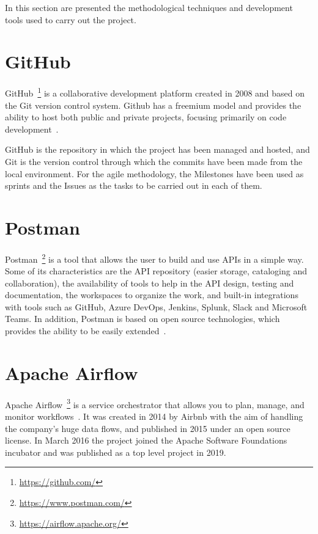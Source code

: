 
\nonzeroparskip In this section are presented the methodological techniques and development tools used to carry out the project.

\section{GitHub}

\nonzeroparskip GitHub~\footnote{\url{https://github.com/}} is a collaborative development platform created in 2008 and based on the Git version control system. Github has a freemium model and provides the ability to host both public and private projects, focusing primarily on code development~\cite{wikipedia_github}.

\nonzeroparskip GitHub is the repository in which the project has been managed and hosted, and Git is the version control through which the commits have been made from the local environment. For the agile methodology, the Milestones have been used as sprints and the Issues as the tasks to be carried out in each of them.

\section{Postman}

\nonzeroparskip Postman~\footnote{\url{https://www.postman.com/}} is a tool that allows the user to build and use APIs in a simple way. Some of its characteristics are the API repository (easier storage, cataloging and collaboration), the availability of tools to help in the API design, testing and documentation, the workspaces to organize the work, and built-in integrations with tools such as GitHub, Azure DevOps, Jenkins, Splunk, Slack and Microsoft Teams. In addition, Postman is based on open source technologies, which provides the ability to be easily extended~\cite{postman}.

\section{Apache Airflow}

\nonzeroparskip Apache Airflow~\footnote{\url{https://airflow.apache.org/}} is a service orchestrator that allows you to plan, manage, and monitor workflows~\cite{airflow}. It was created in 2014 by Airbnb with the aim of handling the company's huge data flows, and published in 2015 under an open source license. In March 2016 the project joined the Apache Software Foundations incubator and was published as a top level project in 2019.

